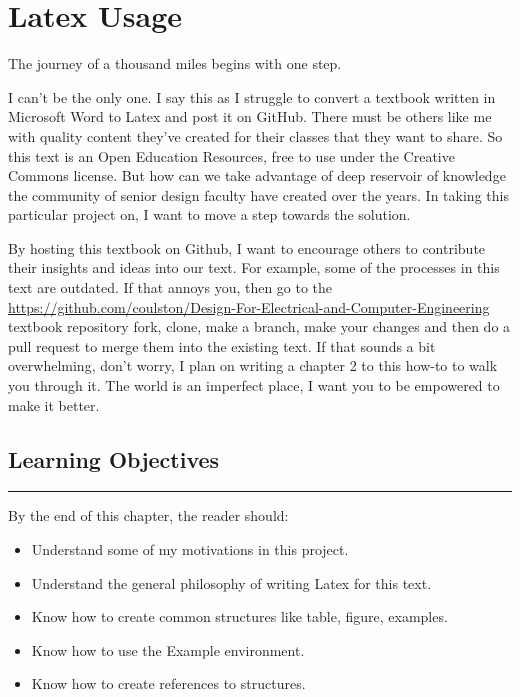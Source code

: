 \chapter{Latex Usage}
\label{chapter:latexUsage}
\graphicspath{ {./chapter01/Fig} }

\begin{itquote}
The journey of a thousand miles begins with one step.
\end{itquote}

I can't be the only one.  I say this as I struggle to convert a textbook written
in Microsoft Word to Latex and post it on GitHub.  There must be others like me
with quality content they've created for their classes that they want to share.
So this text is an Open Education Resources, free to use under the Creative
Commons license.  But how can we take advantage of deep reservoir of 
knowledge the community of senior design faculty have created over the
years.   In taking this particular project on, I want to move a step
towards the solution.

By hosting this textbook on Github, I want to encourage others to contribute 
their insights and ideas into our text.  For example, some of the processes in
this text are outdated. If that annoys you, then go to the
\url{https://github.com/coulston/Design-For-Electrical-and-Computer-Engineering}
{textbook repository} fork, clone, make a branch, make your changes and
then do a pull request to merge them into the existing text.  If that sounds a 
bit overwhelming, don't worry, I plan on writing a chapter 2 to this how-to
to walk you through it.  The world is an imperfect place, I want you to be 
empowered to make it better.

\section*{Learning Objectives}
\noindent\rule{\linewidth}{1pt}
By the end of this chapter, the reader should:
\begin{itemize}
\item 	Understand some of my motivations in this project.
\item 	Understand the general philosophy of writing Latex for this text.
\item Know how to create common structures like table, figure, examples.
\item Know how to use the Example environment.
\item Know how to create references to structures.
\end{itemize}

